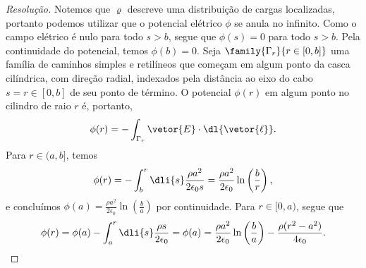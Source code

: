 \begin{proof}[Resolução]
    Notemos que \(\varrho\) descreve uma distribuição de cargas localizadas, portanto podemos utilizar que o potencial elétrico \(\phi\) se anula no infinito. Como o campo elétrico é nulo para todo \(s > b\), segue que \(\phi(s) = 0\) para todo \(s > b\). Pela continuidade do potencial, temos \(\phi(b) = 0\). Seja \(\family{\Gamma_r}{r \in [0,b]}\) uma família de caminhos simples e retilíneos que começam em algum ponto da casca cilíndrica, com direção radial, indexados pela distância ao eixo do cabo \(s = r \in [0, b]\) de seu ponto de término. O potencial \(\phi(r)\) em algum ponto no cilindro de raio \(r\) é, portanto,
    \begin{equation*}
        \phi(r) = -\int_{\Gamma_r} \vetor{E}\cdot \dl{\vetor{\ell}}.
    \end{equation*}
    Para \(r \in (a, b]\), temos
    \begin{equation*}
        \phi(r) = -\int_b^r \dli{s}\frac{\rho a^2}{2 \epsilon_0 s} = \frac{\rho a^2}{2 \epsilon_0} \ln\left(\frac{b}{r}\right),
    \end{equation*}
    e concluímos \(\phi(a) = \frac{\rho a^2}{2 \epsilon_0}\ln\left(\frac{b}{a}\right)\) por continuidade. Para \(r \in [0,a)\), segue que
    \begin{equation*}
        \phi(r) = \phi(a)-\int_a^r \dli{s}\frac{\rho s}{2 \epsilon_0} = \phi(a) = \frac{\rho a^2}{2 \epsilon_0}\ln\left(\frac{b}{a}\right) - \frac{\rho (r^2 - a^2)}{4 \epsilon_0}.
    \end{equation*}
\end{proof}
